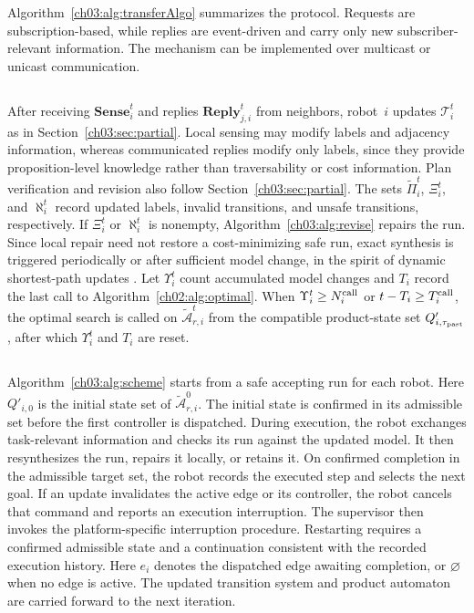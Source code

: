 Algorithm~\ref{ch03:alg:transferAlgo} summarizes the protocol. Requests are
subscription-based, while replies are event-driven and carry only new
subscriber-relevant information. The mechanism can be implemented over
multicast or unicast communication.

\subsection{}
\label{ch03:subsec:multi-revise}

After receiving $\textbf{Sense}_i^t$ and replies
$\textbf{Reply}_{j,i}^t$ from neighbors, robot~$i$ updates
$\mathcal{T}_i^t$ as in Section~\ref{ch03:sec:partial}. Local sensing may
modify labels and adjacency information, whereas communicated replies modify
only labels, since they provide proposition-level knowledge rather than
traversability or cost information.
Plan verification and revision also follow Section~\ref{ch03:sec:partial}.
The sets $\widetilde{\Pi}_i^t$, $\Xi_i^t$, and $\aleph_i^t$ record updated
labels, invalid transitions, and unsafe transitions, respectively. If
$\Xi_i^t$ or $\aleph_i^t$ is nonempty, Algorithm~\ref{ch03:alg:revise} repairs
the run. Since local repair need not restore a cost-minimizing safe run, exact
synthesis is triggered periodically or after sufficient model change, in the
spirit of dynamic shortest-path updates
\citep{chan2009shortest,misra2005dynamic}. Let $\Upsilon_i^t$ count accumulated
model changes and $T_i$ record the last call to Algorithm~\ref{ch02:alg:optimal}.
When $\Upsilon_i^t \geq N_i^{\textup{call}}$ or
$t - T_i \geq T_i^{\textup{call}}$, the optimal search is called on
$\tilde{\mathcal{A}}_{r,i}^t$ from the compatible product-state set
$Q'_{i,\tau_{\textup{past}}}$, after which $\Upsilon_i^t$ and $T_i$ are reset.

\subsection{}\label{ch03:subsec:structure}

\begin{revision}
Algorithm~\ref{ch03:alg:scheme} starts from a safe accepting run for each robot.
Here $Q'_{i,0}$ is the initial state set of $\tilde{\mathcal{A}}_{r,i}^{0}$.
The initial state is confirmed in its admissible set before the first
controller is dispatched.
During execution, the robot exchanges task-relevant information and checks
its run against the updated model. It then resynthesizes the run, repairs it
locally, or retains it. On confirmed completion in the admissible target
set, the robot records the executed step and selects the next goal.
If an update invalidates the active edge or its controller, the robot
cancels that command and reports an execution interruption. The supervisor
then invokes the platform-specific interruption procedure. Restarting
requires a confirmed admissible state and a continuation consistent
with the recorded execution history.
Here $e_i$ denotes the dispatched edge awaiting completion, or
$\varnothing$ when no edge is active.
The updated transition system and product
automaton are carried forward to the next iteration.
\end{revision}

